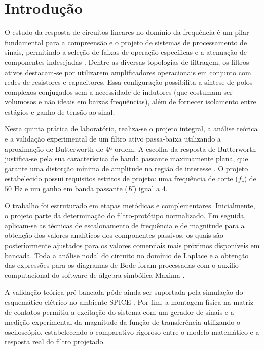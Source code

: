 \chapter{Introdução}

O estudo da resposta de circuitos lineares no domínio da frequência é um pilar fundamental para a compreensão e o projeto de sistemas de processamento de sinais, permitindo a seleção de faixas de operação específicas e a atenuação de componentes indesejadas \cite{nilsson}. Dentre as diversas topologias de filtragem, os filtros ativos destacam-se por utilizarem amplificadores operacionais em conjunto com redes de resistores e capacitores. Essa configuração possibilita a síntese de polos complexos conjugados sem a necessidade de indutores (que costumam ser volumosos e não ideais em baixas frequências), além de fornecer isolamento entre estágios e ganho de tensão ao sinal.

Nesta quinta prática de laboratório, realiza-se o projeto integral, a análise teórica e a validação experimental de um filtro ativo passa-baixa utilizando a aproximação de Butterworth de 4ª ordem. A escolha da resposta de Butterworth justifica-se pela sua característica de banda passante maximamente plana, que garante uma distorção mínima de amplitude na região de interesse \cite{nilsson}. O projeto estabelecido possui requisitos estritos de projeto: uma frequência de corte ($f_c$) de $50\text{ Hz}$ e um ganho em banda passante ($K$) igual a 4.

O trabalho foi estruturado em etapas metódicas e complementares. Inicialmente, o projeto parte da determinação do filtro-protótipo normalizado. Em seguida, aplicam-se as técnicas de escalonamento de frequência e de magnitude para a obtenção dos valores analíticos dos componentes passivos, os quais são posteriormente ajustados para os valores comerciais mais próximos disponíveis em bancada. Toda a análise nodal do circuito no domínio de Laplace e a obtenção das expressões para os diagramas de Bode foram processadas com o auxílio computacional do software de álgebra simbólica Maxima \cite{maxima}.

A validação teórica pré-bancada pôde ainda ser suportada pela simulação do esquemático elétrico no ambiente SPICE \cite{ltspice}. Por fim, a montagem física na matriz de contatos permitiu a excitação do sistema com um gerador de sinais e a medição experimental da magnitude da função de transferência utilizando o osciloscópio, estabelecendo o comparativo rigoroso entre o modelo matemático e a resposta real do filtro projetado.

